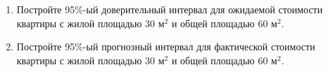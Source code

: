 \documentclass[12pt]{article}\usepackage[]{graphicx}\usepackage[svgnames]{xcolor}
\begin{document}
\begin{enumerate}
\begin{enumerate}
\item Постройте 95\%-ый доверительный интервал для ожидаемой стоимости квартиры с жилой площадью $30$ м$^2$ и общей площадью $60$ м$^2$.
\item Постройте 95\%-ый прогнозный интервал для фактической стоимости квартиры с жилой площадью $30$ м$^2$ и общей площадью $60$ м$^2$.
\end{enumerate}

\end{enumerate}
\end{document}
